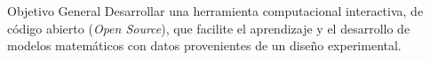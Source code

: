 \begin{frame}[t]{Objetivo General}\vspace{10pt}
Desarrollar una herramienta computacional interactiva, de código abierto (\textit{Open Source}), que facilite el aprendizaje y el desarrollo de modelos matemáticos con datos provenientes de un diseño experimental.
\end{frame}